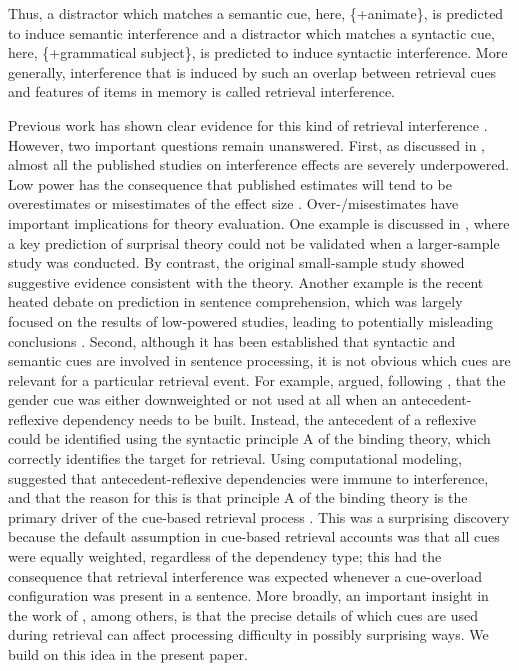 \documentclass[a4paper, man, floatsintext]{apa7}
\begin{document}
Thus, a distractor which matches a semantic cue, here, \{+animate\}, is predicted to induce semantic interference and a distractor which matches a syntactic cue, here, \{+grammatical subject\}, is predicted to induce syntactic interference. More generally, interference that is induced by such an overlap between retrieval cues and features of items in memory is called retrieval interference.

Previous work has shown clear evidence for this kind of retrieval interference \parencite{vandyke07, vandyke_mcelree06, vandyke_mcelree2011, nicenboim,  vandyke_lewis03,jaeger_etal_2017}. However, two important questions remain unanswered. First, as discussed in \textcite{jaeger_etal_2017}, almost all the published studies on interference effects are severely underpowered. Low power has the consequence that published estimates will tend to be overestimates or misestimates of the effect size \parencite{vasishth2018_signficancefilter}. Over-/misestimates have important implications for theory evaluation. One example is discussed in \textcite{vasishth2018_signficancefilter}, where a key prediction of surprisal theory \parencite{levy&keller_2013} could not be validated when a larger-sample study was conducted. By contrast, the original small-sample study \parencite{levy&keller_2013} showed suggestive evidence consistent with the theory. Another example is the recent heated debate \parencite{nieuwland_etal_2018} on prediction in sentence comprehension, which was largely focused on the results of low-powered studies, leading to potentially misleading conclusions \parencite{nicenboim_etal_2020}.
Second, although it has been established \parencite[e.g.,][]{vandyke07,mertzen} that syntactic and semantic cues are involved in sentence processing, it is not obvious which cues are relevant for a particular retrieval event. For example, \textcite{dillon2013} argued, following \textcite{Sturt2003}, that the gender cue was either downweighted or not used at all when an antecedent-reflexive dependency needs to be built. Instead, the antecedent of a reflexive could be identified using the syntactic principle A of the binding theory, which correctly identifies the target for retrieval.  Using computational modeling, \textcite{dillon2013} suggested that antecedent-reflexive dependencies were immune to interference, and that the reason for this is that principle A of the binding theory is the primary driver of the cue-based retrieval process \parencite[cf. ][]{jaeger_etal_2020,yadav2021individual}. This was a surprising discovery because the default assumption in cue-based retrieval accounts was that all cues were equally weighted, regardless of the dependency type; this had the consequence that retrieval interference was expected whenever a cue-overload configuration was present in a sentence. More broadly, an important insight in the work of \textcite{dillon2013}, among others, is that  the precise details of which cues are used during retrieval can affect processing difficulty in possibly surprising ways. We build on this idea in the present paper.
\end{document}
